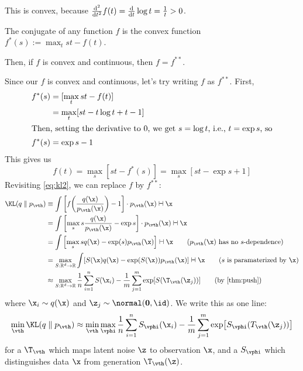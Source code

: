 \documentclass[class=cs480,notes,tikz]{agony}
\begin{document}
This is convex, because $\dv[2]{t} f(t) = \dv{t} \log t = \frac1t > 0$.

\begin{defn}
  The conjugate of any function $f$ is the convex function $f^*(s) := \max_t st - f(t)$.

  Then, if $f$ is convex and continuous, then $f = f^{**}$.
\end{defn}

Since our $f$ is convex and continuous, let's try writing $f$ as $f^{**}$. First,
\begin{align*}
  f^*(s) & = [\max_t st - f(t)]            \\
         & = \max_t [st - t\log t + t - 1] \\
  \intertext{Then, setting the derivative to 0, we get $s = \log t$, i.e., $t = \exp s$, so}
  f^*(s) & = \exp s - 1
\end{align*}
This gives us
\[ f(t) = \max_s [st - f^*(s)] = \max_s [st - \exp s + 1] \]
Revisiting \cref{eq:kl2}, we can replace $f$ by $f^{**}$:
\begin{align*}
  \KL(q \parallel p_{\vth})
   & \equiv \int \qty[f\qty(\frac{q(\x)}{p_{\vth}(\x)})-1]\cdot p_{\vth}(\x) \dd{\x}                                                     \\
   & = \int \qty[\max_s s\frac{q(\x)}{p_{\vth}(\x)} - \exp s] \cdot p_{\vth}(\x) \dd{\x}                                                 \\
   & = \int \qty[\max_s sq(\x) - \exp(s)p_{\vth}(\x)] \dd{\x} \tag{$p_{\vth}(\x)$ has no $s$-dependence}                                 \\
   & = \max_{S : \R^d \to \R} \int [S(\x)q(\x) - \exp(S(\x))p_{\vth}(\x)] \dd{\x} \tag{$s$ is paramaterized by $\x$}                     \\
   & \approx \max_{S : \R^d \to \R} \frac1n\sum_{i=1}^n S(\x_i) - \frac1m \sum_{j=1}^m \exp[S(\T_{\vth}(\z_j))] \tag{by \cref{thm:push}}
\end{align*}
where $\x_i \sim q(\x)$ and $\z_j \sim \normal(\vb 0, \id)$.
We write this as one line:
\begin{equation}
  \min_{\vth} \KL(q \parallel p_{\vth})
  \approx \min_{\vth} \max_{\vphi} \frac1n\sum_{i=1}^n S_{\vphi}(\x_i) - \frac1m \sum_{j=1}^m \exp[S_{\vphi}(T_{\vth}(\z_j))]
\end{equation}
for a  $\T_{\vth}$ which maps latent noise $\z$ to observation $\x$,
and a  $S_{\vphi}$ which distinguishes data $\x$ from generation $\T_{\vth}(\z)$.
\end{document}
